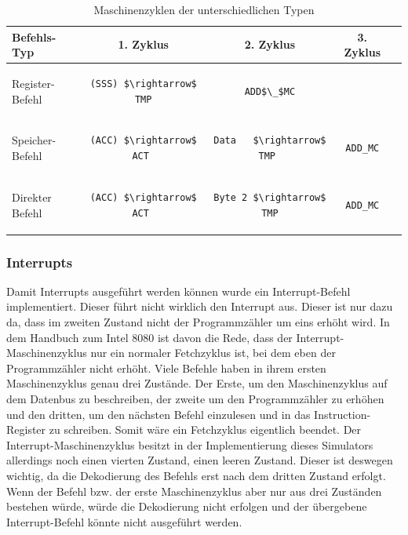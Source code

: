 \documentclass[12pt]{article}
\newcommand{\imgSpaceBefore}{\vspace{10pt}}
\begin{document}
\imgSpaceBefore
\begin{table}[H]
\centering
\begin{tabular}{|l|c|c|c|c| } 
 \hline
 Befehls-Typ & 1. Zyklus & 2. Zyklus & 3. Zyklus \\
 \hline 
 Register-Befehl
 &
 \begin{lstlisting}
(SSS) $\rightarrow$ TMP
 \end{lstlisting}
 &
 \begin{lstlisting}
ADD$\_$MC
 \end{lstlisting}
 & \\
 
 Speicher-Befehl & 
 \begin{lstlisting}
(ACC) $\rightarrow$ ACT 
 \end{lstlisting}  
  & 
 \begin{lstlisting}
Data   $\rightarrow$ TMP 
 \end{lstlisting} 
 & 
 \begin{lstlisting}
ADD_MC
 \end{lstlisting} 
 \\ 
 
 Direkter Befehl & 
 \begin{lstlisting}
(ACC) $\rightarrow$ ACT 
 \end{lstlisting} 
 & 
 \begin{lstlisting}
Byte 2 $\rightarrow$ TMP
 \end{lstlisting} 
 &
  \begin{lstlisting}
ADD_MC
 \end{lstlisting}
 \\
 
 \hline
\end{tabular}
\caption{Maschinenzyklen der unterschiedlichen Typen}
\label{table:mc_types}
\end{table}

\subsubsection{Interrupts}
Damit Interrupts ausgeführt werden können wurde ein Interrupt-Befehl implementiert. Dieser führt nicht wirklich den Interrupt aus. Dieser ist nur dazu da, dass im zweiten Zustand nicht der Programmzähler um eins erhöht wird. In dem Handbuch zum Intel 8080 \cite{IntMan16} ist davon die Rede, dass der Interrupt-Maschinenzyklus nur ein normaler Fetchzyklus ist, bei dem eben der Programmzähler nicht erhöht. Viele Befehle haben in ihrem ersten Maschinenzyklus genau drei Zustände. Der Erste, um den Maschinenzyklus auf dem Datenbus zu beschreiben, der zweite um den Programmzähler zu erhöhen und den dritten, um den nächsten Befehl einzulesen und in das Instruction-Register zu schreiben. Somit wäre ein Fetchzyklus eigentlich beendet. Der Interrupt-Maschinenzyklus besitzt in der Implementierung dieses Simulators allerdings noch einen vierten Zustand, einen leeren Zustand. Dieser ist deswegen wichtig, da die Dekodierung des Befehls erst nach dem dritten Zustand erfolgt. Wenn der Befehl bzw. der erste Maschinenzyklus aber nur aus drei Zuständen bestehen würde, würde die Dekodierung nicht erfolgen und der übergebene Interrupt-Befehl könnte nicht ausgeführt werden. 
\end{document}
